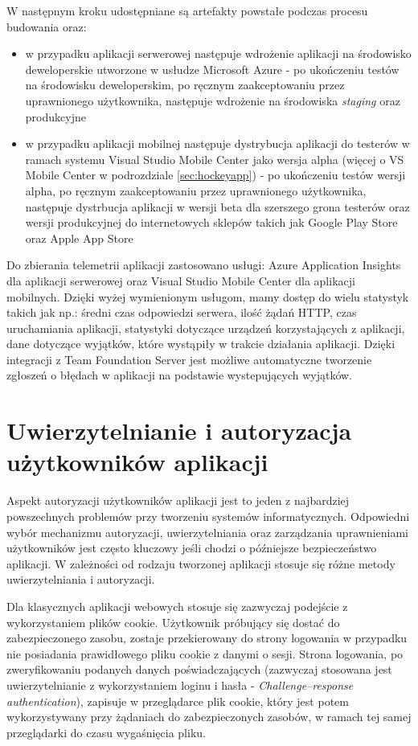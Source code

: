 W następnym kroku udostępniane są artefakty powstałe podczas procesu budowania oraz:
\begin{itemize}
\item w przypadku aplikacji serwerowej następuje wdrożenie aplikacji na środowisko deweloperskie utworzone w usłudze Microsoft Azure - po ukończeniu testów na środowisku deweloperskim, po ręcznym zaakceptowaniu przez uprawnionego użytkownika, następuje wdrożenie na środowiska \textit{staging} oraz produkcyjne
\item w przypadku aplikacji mobilnej następuje dystrybucja aplikacji do testerów w ramach systemu Visual Studio Mobile Center jako wersja alpha (więcej o VS Mobile Center w podrozdziale \ref{sec:hockeyapp}) - po ukończeniu testów wersji alpha, po ręcznym zaakceptowaniu przez uprawnionego użytkownika, następuje dystrbucja aplikacji w wersji beta dla szerszego grona testerów oraz wersji produkcyjnej do internetowych sklepów takich jak Google Play Store oraz Apple App Store
\end{itemize}

Do zbierania telemetrii aplikacji zastosowano usługi: Azure Application Insights dla aplikacji serwerowej oraz Visual Studio Mobile Center dla aplikacji mobilnych. Dzięki wyżej wymienionym usługom, mamy dostęp do wielu statystyk takich jak np.: średni czas odpowiedzi serwera, ilość żądań HTTP, czas uruchamiania aplikacji, statystyki dotyczące urządzeń korzystających z aplikacji, dane dotyczące wyjątków, które wystąpiły w trakcie działania aplikacji. Dzięki integracji z Team Foundation Server jest możliwe automatyczne tworzenie zgłoszeń o błędach w aplikacji na podstawie wystepujących wyjątków.
\section{Uwierzytelnianie i autoryzacja użytkowników aplikacji}
Aspekt autoryzacji użytkowników aplikacji jest to jeden z najbardziej powszechnych problemów przy tworzeniu systemów informatycznych. Odpowiedni wybór mechanizmu autoryzacji, uwierzytelniania oraz zarządzania uprawnieniami użytkowników jest często kluczowy jeśli chodzi o późniejsze bezpieczeństwo aplikacji. W zależności od rodzaju tworzonej aplikacji stosuje się różne metody uwierzytelniania i autoryzacji. 

Dla klasycznych aplikacji webowych stosuje się zazwyczaj podejście z wykorzystaniem plików cookie. Użytkownik próbujący się dostać do zabezpieczonego zasobu, zostaje przekierowany do strony logowania w przypadku nie posiadania prawidłowego pliku cookie z danymi o sesji. Strona logowania, po zweryfikowaniu podanych danych poświadczających (zazwyczaj stosowana jest uwierzytelnianie z wykorzystaniem loginu i hasła - \textit{Challenge–response authentication}), zapisuje w przeglądarce plik cookie, który jest potem wykorzystywany przy żądaniach do zabezpieczonych zasobów, w ramach tej samej przeglądarki do czasu wygaśnięcia pliku.

